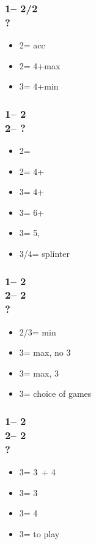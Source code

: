 \documentclass[12pt, a4paper]{report}
\begin{document}
{{        \subsubsection*{1\nt -- 2\diams/2\hearts\\
                        ?}
        \begin{itemize}
            \item 2\major = acc
            \item 2\nt = 4+\major max
            \item 3\major = 4+\major min
        \end{itemize}

        \subsubsection*{1\nt -- 2\diams\\
                        2\hearts -- ?}
        \begin{itemize}
            \item 2\spades = \inv
            \item 2\nt = 4+\clubs\ \gf
            \item 3\clubs = 4+\diams\ \gf
            \item 3\diams = 6+\hearts\ \gf
            \item 3\hearts = 5\spades, \inv
            \item 3\spades/4\minor = splinter
        \end{itemize}

        \subsubsection*{1\nt -- 2\diams\\
                        2\hearts -- 2\spades\\
                        ?}
        \begin{itemize}
            \item 2\nt/3\hearts = min
            \item 3\clubs = max, no 3\hearts
            \item 3\diams = max, 3\hearts
            \item 3\nt = choice of games
        \end{itemize}

        \subsubsection*{1\nt -- 2\diams\\
                        2\hearts -- 2\nt\\
                        ?}
        \begin{itemize}
            \item 3\clubs = 3\hearts\ + 4\clubs
            \item 3\diams = 3\hearts
            \item 3\hearts = 4\clubs
            \item 3\nt = to play
        \end{itemize}

}}
\end{document}
